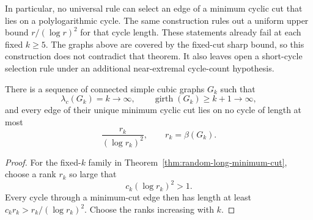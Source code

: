 In particular, no universal rule can select an edge of a minimum cyclic cut that lies on a polylogarithmic cycle.
The same construction rules out a uniform upper bound $r/(\log r)^2$ for that cycle length.
These statements already fail at each fixed $k\ge5$.
The graphs above are covered by the fixed-cut sharp bound, so this construction does not contradict that theorem.
It also leaves open a short-cycle selection rule under an additional near-extremal cycle-count hypothesis.

\begin{corollary}
\label{cor:random-long-cut-diagonal}
There is a sequence of connected simple cubic graphs $G_k$ such that
\[
 \lambda_c(G_k)=k\longrightarrow\infty,
 \qquad
 \operatorname{girth}(G_k)\ge k+1\longrightarrow\infty,
\]
and every edge of their unique minimum cyclic cut lies on no cycle of length at most
\[
 \frac{r_k}{(\log r_k)^2},
 \qquad r_k=\beta(G_k).
\]
\end{corollary}

\begin{proof}
For the fixed-$k$ family in Theorem~\ref{thm:random-long-minimum-cut}, choose a rank $r_k$ so large that
\[
 c_k(\log r_k)^2>1.
\]
Every cycle through a minimum-cut edge then has length at least $c_k r_k>r_k/(\log r_k)^2$.
Choose the ranks increasing with $k$.
\end{proof}
